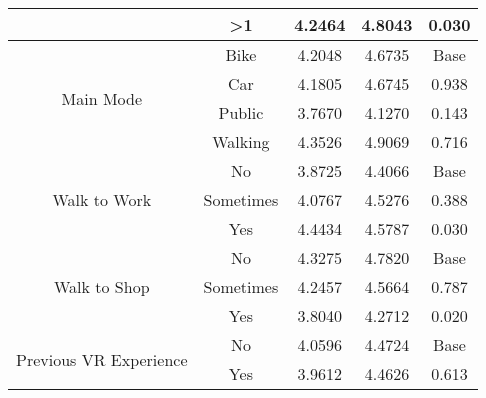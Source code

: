 \begin{small}
\begin{longtable}{|ccccc|}
                                          & \textgreater{}1 & 4.2464                       & 4.8043                       & 0.030            \\ \hline
\multirow{4}{*}{Main Mode}                & Bike            & 4.2048                       & 4.6735                       & Base             \\ 
                                          & Car             & 4.1805                       & 4.6745                       & 0.938            \\ 
                                          & Public          & 3.7670                       & 4.1270                       & 0.143            \\ 
                                          & Walking         & 4.3526                       & 4.9069                       & 0.716            \\ \hline
\multirow{3}{*}{Walk to Work}             & No              & 3.8725                       & 4.4066                       & Base             \\ 
                                          & Sometimes       & 4.0767                       & 4.5276                       & 0.388            \\ 
                                          & Yes             & 4.4434                       & 4.5787                       & 0.030            \\ \hline
\multirow{3}{*}{Walk to Shop}             & No              & 4.3275                       & 4.7820                       & Base             \\ 
                                          & Sometimes       & 4.2457                       & 4.5664                       & 0.787            \\ 
                                          & Yes             & 3.8040                       & 4.2712                       & 0.020            \\ \hline
\multirow{2}{*}{Previous VR   Experience} & No              & 4.0596                       & 4.4724                       & Base             \\ 
                                          & Yes             & 3.9612                       & 4.4626                       & 0.613            \\ \hline
\end{longtable}
\end{small}
